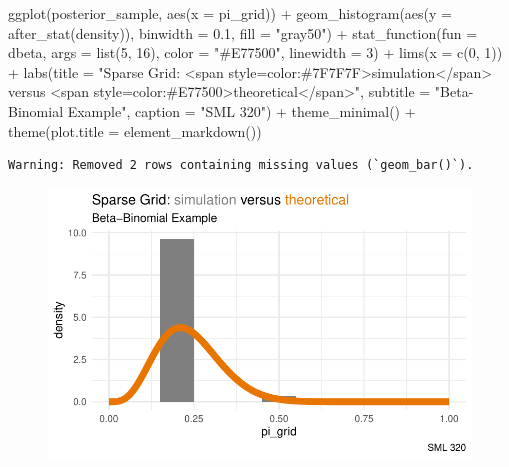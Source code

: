 \documentclass[
  letterpaper,
  DIV=11,
  numbers=noendperiod]{scrartcl}
\newenvironment{Shaded}{\begin{snugshade}}{\end{snugshade}}
\newcommand{\AttributeTok}[1]{\textcolor[rgb]{0.40,0.45,0.13}{#1}}
\newcommand{\DecValTok}[1]{\textcolor[rgb]{0.68,0.00,0.00}{#1}}
\newcommand{\FloatTok}[1]{\textcolor[rgb]{0.68,0.00,0.00}{#1}}
\newcommand{\FunctionTok}[1]{\textcolor[rgb]{0.28,0.35,0.67}{#1}}
\newcommand{\NormalTok}[1]{\textcolor[rgb]{0.00,0.23,0.31}{#1}}
\newcommand{\SpecialCharTok}[1]{\textcolor[rgb]{0.37,0.37,0.37}{#1}}
\newcommand{\StringTok}[1]{\textcolor[rgb]{0.13,0.47,0.30}{#1}}
\begin{document}
\begin{Shaded}
\begin{Highlighting}[]
\FunctionTok{ggplot}\NormalTok{(posterior\_sample, }\FunctionTok{aes}\NormalTok{(}\AttributeTok{x =}\NormalTok{ pi\_grid)) }\SpecialCharTok{+} 
  \FunctionTok{geom\_histogram}\NormalTok{(}\FunctionTok{aes}\NormalTok{(}\AttributeTok{y =} \FunctionTok{after\_stat}\NormalTok{(density)), }
                 \AttributeTok{binwidth =} \FloatTok{0.1}\NormalTok{,}
                 \AttributeTok{fill =} \StringTok{"gray50"}\NormalTok{) }\SpecialCharTok{+} 
  \FunctionTok{stat\_function}\NormalTok{(}\AttributeTok{fun =}\NormalTok{ dbeta, }\AttributeTok{args =} \FunctionTok{list}\NormalTok{(}\DecValTok{5}\NormalTok{, }\DecValTok{16}\NormalTok{),}
                \AttributeTok{color =} \StringTok{"\#E77500"}\NormalTok{, }\AttributeTok{linewidth =} \DecValTok{3}\NormalTok{) }\SpecialCharTok{+} 
  \FunctionTok{lims}\NormalTok{(}\AttributeTok{x =} \FunctionTok{c}\NormalTok{(}\DecValTok{0}\NormalTok{, }\DecValTok{1}\NormalTok{)) }\SpecialCharTok{+}
  \FunctionTok{labs}\NormalTok{(}\AttributeTok{title =} \StringTok{"Sparse Grid: \textless{}span style=\textquotesingle{}color:\#7F7F7F\textquotesingle{}\textgreater{}simulation\textless{}/span\textgreater{} versus \textless{}span style=\textquotesingle{}color:\#E77500\textquotesingle{}\textgreater{}theoretical\textless{}/span\textgreater{}"}\NormalTok{,}
         \AttributeTok{subtitle =} \StringTok{"Beta{-}Binomial Example"}\NormalTok{,}
         \AttributeTok{caption =} \StringTok{"SML 320"}\NormalTok{) }\SpecialCharTok{+}
  \FunctionTok{theme\_minimal}\NormalTok{() }\SpecialCharTok{+}
  \FunctionTok{theme}\NormalTok{(}\AttributeTok{plot.title =} \FunctionTok{element\_markdown}\NormalTok{())}
\end{Highlighting}
\end{Shaded}

\begin{verbatim}
Warning: Removed 2 rows containing missing values (`geom_bar()`).
\end{verbatim}

\begin{figure}[H]

{\centering \includegraphics{ps4_code_files/figure-pdf/unnamed-chunk-14-1.pdf}

}

\end{figure}
\end{document}
